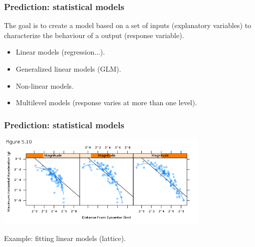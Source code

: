 
\begin{frame}
\frametitle{Prediction: statistical models}

The goal is to create a model based on a set of inputs (explanatory variables) to characterize
the behaviour of a output (response variable).

\begin{itemize}
 \item Linear models (regression...).
 \item Generalized linear models (GLM).
 \item Non-linear models.
 \item Multilevel models (response varies at more than one level).
\end{itemize}


\end{frame}


\begin{frame}
\frametitle{Prediction: statistical models}

\begin{center}
 \includegraphics[height=4.5cm]{figs/linear-models.png}
\end{center}

\begin{flushright}
\small Example: fitting linear models (lattice).
\end{flushright}

\end{frame}


